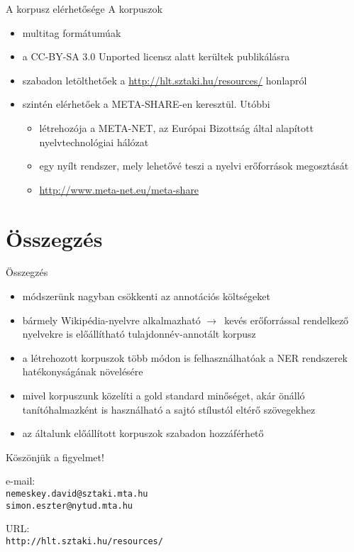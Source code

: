 \documentclass[utf8x,t]{beamer}
\newcommand{\vitem}{\item \vspace{4pt}}
\newcommand{\nyil}{$\rightarrow$\ }
\begin{document}
\begin{frame}{A korpusz elérhetősége}
\bigskip
A korpuszok
\begin{itemize}
\vitem multitag formátumúak
\vitem a CC-BY-SA 3.0 Unported licensz alatt kerültek publikálásra
\vitem szabadon letölthetőek a \url{http://hlt.sztaki.hu/resources/} honlapról
\vitem szintén elérhetőek a META-SHARE-en keresztül. Utóbbi
  \begin{itemize}
  \vitem létrehozója a META-NET, az Európai Bizottság által alapított nyelvtechnológiai hálózat
  \vitem egy nyílt rendszer, mely lehetővé teszi a nyelvi erőforrások megosztását
  \vitem \url{http://www.meta-net.eu/meta-share}
  \end{itemize}
\end{itemize}

\end{frame}

\section{Összegzés}
\begin{frame}{Összegzés}
  \begin{itemize}
  \vitem módszerünk nagyban csökkenti az annotációs költségeket 
  \vitem bármely Wikipédia-nyelvre alkalmazható \nyil kevés erőforrással rendelkező nyelvekre is előállítható tulajdonnév-annotált korpusz
  \vitem a létrehozott korpuszok több módon is felhasználhatóak a NER rendszerek hatékonyságának növelésére
  \vitem mivel korpuszunk közelíti a gold standard minőséget, akár önálló tanítóhalmazként is használható a sajtó stílustól eltérő szövegekhez
  \vitem az általunk előállított korpuszok szabadon hozzáférhető
  \end{itemize}
  \vfill
\end{frame}

\begin{frame}

\bigskip

\bigskip

{\huge Köszönjük a figyelmet!}

\bigskip
\bigskip
\bigskip

e-mail: \\ {\tt nemeskey.david@sztaki.mta.hu \\ simon.eszter@nytud.mta.hu} \\

\bigskip
\bigskip

URL: \\ {\tt http://hlt.sztaki.hu/resources/}


\end{frame}
\end{document}
